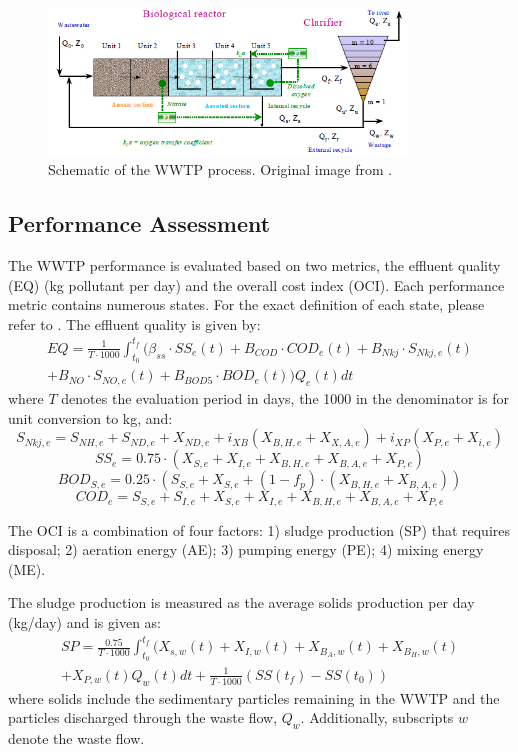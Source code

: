 \begin{figure}[H]
    \centering
    \includegraphics[width=0.85\textwidth]{images/ch3/WWTP.png}
    \caption{Schematic of the WWTP process. Original image from \cite{wwtp}.}
    \label{fig:04WWTP}
\end{figure}

\subsection{Performance Assessment}
The WWTP performance is evaluated based on two metrics, the effluent quality (EQ) (kg pollutant per day) and the overall cost index (OCI). Each performance metric contains numerous states.  For the exact definition of each state, please refer to \cite{wwtp}.  The effluent quality is given by:
\begin{multline}
    EQ = \frac{1}{T \cdot 1000} \int^{t_f}_{t_0} ( \beta_{ss} \cdot SS_e(t) + B_{COD} \cdot COD_e(t) + B_{Nkj} \cdot S_{Nkj, e}(t) \\ 
    + B_{NO} \cdot S_{NO, e}(t) + B_{BOD5} \cdot BOD_e(t)) Q_e(t) dt
\end{multline}
where $T$ denotes the evaluation period in days, the 1000 in the denominator is for unit conversion to kg, and:
$$S_{Nkj, e} = S_{NH, e} + S_{ND, e} + X_{ND, e} + i_{XB}(X_{B, H, e} + X_{X, A, e}) + i_{XP} (X_{P, e} + X_{i, e})$$
$$SS_e = 0.75 \cdot (X_{S, e} + X_{I, e} + X_{B, H, e} + X_{B, A, e} + X_{P, e})$$
$$BOD_{S, e} = 0.25 \cdot (S_{S, e} + X_{S, e} + (1 - f_p) \cdot (X_{B, H, e} + X_{B, A, e}))$$
$$COD_e = S_{S, e} + S_{I, e} + X_{S, e} + X_{I, e} + X_{B, H, e} + X_{B, A, e} + X_{P, e}$$

The OCI is a combination of four factors: 1) sludge production (SP) that requires disposal; 2) aeration energy (AE); 3) pumping energy (PE);  4) mixing energy (ME). 

The sludge production is measured as the average solids production per day (kg/day) and is given as:
\begin{multline}
    SP = \frac{0.75}{T \cdot 1000} \int_{t_0}^{t_f} (X_{s, w}(t) + X_{I, w}(t) + X_{B_A, w}(t) + X_{B_H, w}(t) \\ 
    + X_{P, w}(t) Q_w(t)dt + \frac{1}{T \cdot 1000} (SS(t_f) - SS(t_0))
\end{multline}
where solids include the sedimentary particles remaining in the WWTP and the particles discharged through the waste flow, $Q_w$. Additionally, subscripts $w$ denote the waste flow.

